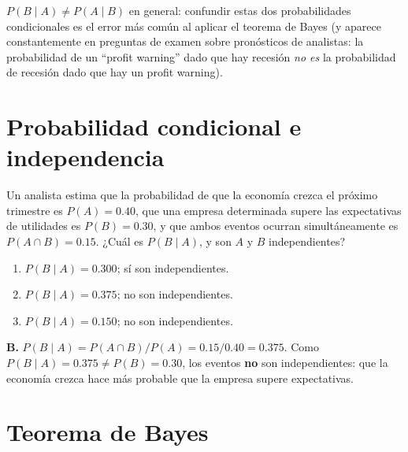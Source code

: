 \documentclass[11pt,a4paper,oneside]{article}
\theoremstyle{definition}
\begin{document}
\begin{warningBox}
$P(B\mid A)\ne P(A\mid B)$ en general: confundir estas dos probabilidades
condicionales es el error más común al aplicar el teorema de Bayes (y
aparece constantemente en preguntas de examen sobre pronósticos de
analistas: la probabilidad de un ``profit warning'' dado que hay recesión
\emph{no es} la probabilidad de recesión dado que hay un profit warning).
\end{warningBox}

\section{Probabilidad condicional e independencia}

\begin{cfaBox}
Un analista estima que la probabilidad de que la economía crezca el próximo
trimestre es $P(A)=0.40$, que una empresa determinada supere las
expectativas de utilidades es $P(B)=0.30$, y que ambos eventos ocurran
simultáneamente es $P(A\cap B)=0.15$. ¿Cuál es $P(B\mid A)$, y son $A$ y
$B$ independientes?
\begin{enumerate}[label=\Alph*.]
\item $P(B\mid A)=0.300$; sí son independientes.
\item $P(B\mid A)=0.375$; no son independientes.
\item $P(B\mid A)=0.150$; no son independientes.
\end{enumerate}
\end{cfaBox}
\begin{solBox}
\textbf{B.} $P(B\mid A)=P(A\cap B)/P(A)=0.15/0.40=0.375$. Como
$P(B\mid A)=0.375\ne P(B)=0.30$, los eventos \textbf{no} son
independientes: que la economía crezca hace más probable que la empresa
supere expectativas.
\end{solBox}

\section{Teorema de Bayes}
\end{document}
